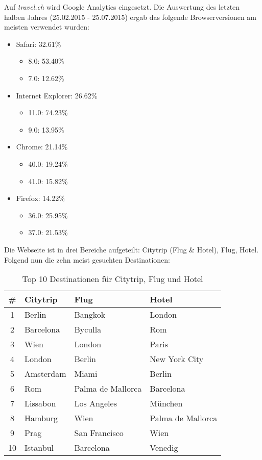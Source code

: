Auf \textit{travel.ch} wird Google Analytics eingesetzt. Die Auswertung des letzten halben Jahres (25.02.2015 - 25.07.2015) ergab das folgende Browserversionen am meisten verwendet wurden:
\begin{itemize}
\item Safari: 32.61\%
	\begin{itemize}
			\item 8.0: 53.40\%
			\item 7.0: 12.62\%
	\end{itemize}
\item Internet Explorer: 26.62\%
	\begin{itemize}
			\item 11.0: 74.23\%
			\item 9.0: 13.95\%
	\end{itemize}
\item Chrome: 21.14\%
	\begin{itemize}
			\item 40.0: 19.24\%
			\item 41.0: 15.82\%
	\end{itemize}
\item Firefox: 14.22\%
	\begin{itemize}
			\item 36.0: 25.95\%
			\item 37.0: 21.53\%
	\end{itemize}
\end{itemize}

Die Webseite ist in drei Bereiche aufgeteilt: Citytrip (Flug \& Hotel), Flug, Hotel. Folgend nun die zehn meist gesuchten Destinationen:
\begin{table}[H] 
	\caption{Top 10 Destinationen für Citytrip, Flug und Hotel}
	\centering
	
	\begin{tabular}{ | c | l | l | l | } 
		\hline 
		\textbf{\#} & \textbf{Citytrip} & \textbf{Flug} & \textbf{Hotel} \\ \hline 
		1 & Berlin & Bangkok & London \\ \hline
		2 & Barcelona & Byculla & Rom \\ \hline
		3 & Wien & London & Paris \\ \hline
		4 & London & Berlin & New York City \\ \hline
		5 & Amsterdam & Miami & Berlin \\ \hline
		6 & Rom & Palma de Mallorca & Barcelona \\ \hline
		7 & Lissabon & Los Angeles & München \\ \hline
		8 & Hamburg & Wien  & Palma de Mallorca \\ \hline
		9 & Prag & San Francisco & Wien \\ \hline
		10 & Istanbul & Barcelona & Venedig \\ \hline
	\end{tabular} 
\end{table}